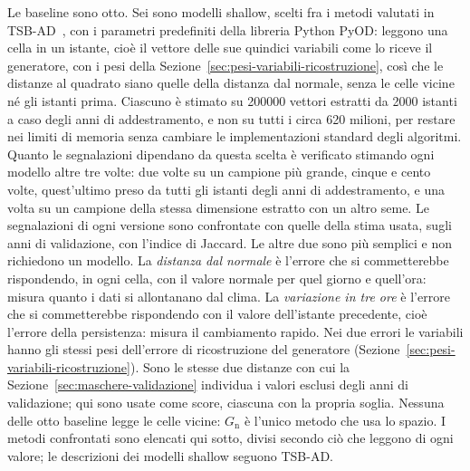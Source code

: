 Le baseline sono otto. Sei sono modelli shallow, scelti fra i metodi valutati in TSB-AD~\cite{liu2024elephant}, con i parametri predefiniti della libreria Python PyOD: leggono una cella in un istante, cioè il vettore delle sue quindici variabili come lo riceve il generatore, con i pesi della Sezione~\ref{sec:pesi-variabili-ricostruzione}, così che le distanze al quadrato siano quelle della distanza dal normale, senza le celle vicine né gli istanti prima. Ciascuno è stimato su 200000 vettori estratti da 2000 istanti a caso degli anni di addestramento, e non su tutti i circa 620 milioni, per restare nei limiti di memoria senza cambiare le implementazioni standard degli algoritmi. Quanto le segnalazioni dipendano da questa scelta è verificato stimando ogni modello altre tre volte: due volte su un campione più grande, cinque e cento volte, quest'ultimo preso da tutti gli istanti degli anni di addestramento, e una volta su un campione della stessa dimensione estratto con un altro seme. Le segnalazioni di ogni versione sono confrontate con quelle della stima usata, sugli anni di validazione, con l'indice di Jaccard. Le altre due sono più semplici e non richiedono un modello. La \emph{distanza dal normale} è l'errore che si commetterebbe rispondendo, in ogni cella, con il valore normale per quel giorno e quell'ora: misura quanto i dati si allontanano dal clima. La \emph{variazione in tre ore} è l'errore che si commetterebbe rispondendo con il valore dell'istante precedente, cioè l'errore della persistenza: misura il cambiamento rapido. Nei due errori le variabili hanno gli stessi pesi dell'errore di ricostruzione del generatore (Sezione~\ref{sec:pesi-variabili-ricostruzione}). Sono le stesse due distanze con cui la Sezione~\ref{sec:maschere-validazione} individua i valori esclusi degli anni di validazione; qui sono usate come score, ciascuna con la propria soglia. Nessuna delle otto baseline legge le celle vicine: $G_{\mathrm{n}}$ è l'unico metodo che usa lo spazio. I metodi confrontati sono elencati qui sotto, divisi secondo ciò che leggono di ogni valore; le descrizioni dei modelli shallow seguono TSB-AD.

